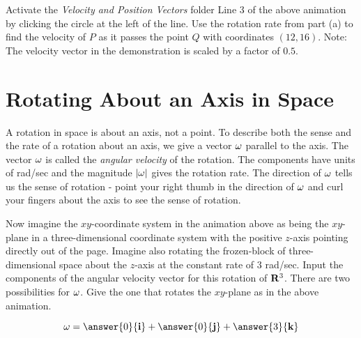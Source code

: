 \documentclass{ximera}
\begin{document}
\begin{exploration}
\begin{question}   \label{Q3456457l:Cross}
Activate the {\it Velocity and Position Vectors} folder Line 3 of the above animation by clicking the circle at the left of the line. Use the rotation rate from part (a) to find the velocity of $P$ as it passes the point $Q$ with coordinates $(12,16)$. Note: The velocity vector in the demonstration is scaled by a factor of $0.5$.
\end{question}

\end{exploration}



\section{Rotating About an Axis in Space}
A rotation in space is about an axis, not a point. To describe both the sense and the rate of a rotation about an axis, we give a vector ${\bf \omega}$ parallel to the axis. The vector ${\bf\omega}$ is called the \emph{angular velocity} of the rotation. The components have units of rad/sec and the magnitude $|{\bf \omega}|$ gives the rotation rate. The direction of ${\bf \omega}$ tells us the sense of rotation - point your right thumb in the direction of ${\bf \omega}$ and curl your fingers about the axis to see the sense of rotation.





Now imagine the $xy$-coordinate system in the animation above as being the $xy$-plane in a three-dimensional coordinate system with the positive $z$-axis pointing directly out of the page. Imagine also rotating the frozen-block of three-dimensional space about the $z$-axis at the constant rate of $3$ rad/sec. Input the components of the angular velocity vector for this rotation of ${\bf R}^3$. There are two possibilities for ${\bf \omega}$. Give the one that rotates the $xy$-plane as in the above animation. 

\begin{question}  \label{Qhfnbyt:Cross}
\[
{\bf \omega} = \answer{0}{\bf i} + \answer{0}{\bf j} + \answer{3}{\bf k}
\]
\end{question}
\end{document}
